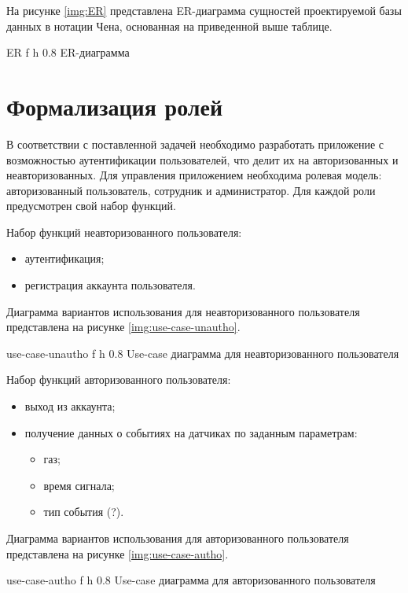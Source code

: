 На рисунке \ref{img:ER} представлена ER-диаграмма сущностей проектируемой базы данных в нотации Чена, основанная на приведенной выше таблице.

    {ER}
    {f}
    {h}
    {0.8\textwidth}
    {ER-диаграмма}


\section{Формализация ролей}
В соответствии с поставленной задачей необходимо разработать приложение с возможностью аутентификации пользователей, что делит их на авторизованных и неавторизованных. Для управления приложением необходима ролевая модель: авторизованный пользователь, сотрудник и администратор. Для каждой роли предусмотрен свой набор функций.

Набор функций неавторизованного пользователя:

\begin{itemize}
	\item аутентификация;
	\item регистрация аккаунта пользователя.
\end{itemize}

Диаграмма вариантов использования для неавторизованного пользователя представлена на рисунке \ref{img:use-case-unautho}.
\clearpage

    {use-case-unautho}
    {f}
    {h}
    {0.8\textwidth}
    {Use-case диаграмма для неавторизованного пользователя}

Набор функций авторизованного пользователя:

\begin{itemize}
	\item выход из аккаунта;
        \item получение данных о событиях на датчиках по заданным параметрам:
        \begin{itemize}
            \item газ;
            \item время сигнала;
            \item тип события (?).
        \end{itemize}
\end{itemize}

Диаграмма вариантов использования для авторизованного пользователя представлена на рисунке \ref{img:use-case-autho}.

    {use-case-autho}
    {f}
    {h}
    {0.8\textwidth}
    {Use-case диаграмма для авторизованного пользователя}

